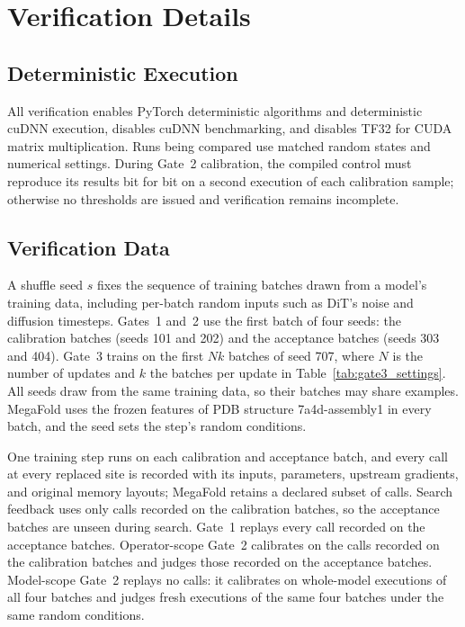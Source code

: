 \makeatletter
\ifbench@restorecolumns
  \twocolumn
\fi
\makeatother








\section{Verification Details}
\label{app:verification_details}

\subsection{Deterministic Execution}
\label{app:determinism}
All verification enables PyTorch deterministic algorithms and deterministic cuDNN execution, disables cuDNN benchmarking, and disables TF32 for CUDA matrix multiplication. Runs being compared use matched random states and numerical settings. During Gate~2 calibration, the compiled control must reproduce its results bit for bit on a second execution of each calibration sample; otherwise no thresholds are issued and verification remains incomplete.

\subsection{Verification Data}
\label{app:recorded_calls}
A shuffle seed $s$ fixes the sequence of training batches drawn from a model's training data, including per-batch random inputs such as DiT's noise and diffusion timesteps. Gates~1 and~2 use the first batch of four seeds: the calibration batches (seeds 101 and 202) and the acceptance batches (seeds 303 and 404). Gate~3 trains on the first $Nk$ batches of seed 707, where $N$ is the number of updates and $k$ the batches per update in Table~\ref{tab:gate3_settings}. All seeds draw from the same training data, so their batches may share examples. MegaFold uses the frozen features of PDB structure 7a4d-assembly1 in every batch, and the seed sets the step's random conditions.

One training step runs on each calibration and acceptance batch, and every call at every replaced site is recorded with its inputs, parameters, upstream gradients, and original memory layouts; MegaFold retains a declared subset of calls. Search feedback uses only calls recorded on the calibration batches, so the acceptance batches are unseen during search. Gate~1 replays every call recorded on the acceptance batches. Operator-scope Gate~2 calibrates on the calls recorded on the calibration batches and judges those recorded on the acceptance batches. Model-scope Gate~2 replays no calls: it calibrates on whole-model executions of all four batches and judges fresh executions of the same four batches under the same random conditions.

